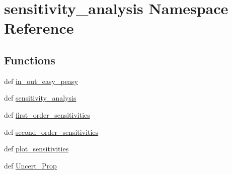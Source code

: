 \hypertarget{namespacesensitivity__analysis}{\section{sensitivity\-\_\-analysis Namespace Reference}
\label{namespacesensitivity__analysis}
}
\subsection*{Functions}
\begin{DoxyCompactItemize}
\item 
def \hyperlink{namespacesensitivity__analysis_abd9d4178caf8223b3e14f69ced11c7a4}{in\-\_\-out\-\_\-easy\-\_\-peasy}
\item 
def \hyperlink{namespacesensitivity__analysis_ac9b02f9b013b469537ee70ac8bbeffdb}{sensitivity\-\_\-analysis}
\item 
def \hyperlink{namespacesensitivity__analysis_aa89e4ea8c55579ee653b3c636d3ae27b}{first\-\_\-order\-\_\-sensitivities}
\item 
def \hyperlink{namespacesensitivity__analysis_a77cd6a629e8dbbe24ff9dc0c96d7c9ce}{second\-\_\-order\-\_\-sensitivities}
\item 
def \hyperlink{namespacesensitivity__analysis_aba2a46a57ce75c604746086079d33e20}{plot\-\_\-sensitivities}
\item 
def \hyperlink{namespacesensitivity__analysis_a8705d10a323431360a5db5ff5d1a2eb3}{Uncert\-\_\-\-Prop}
\end{DoxyCompactItemize}
